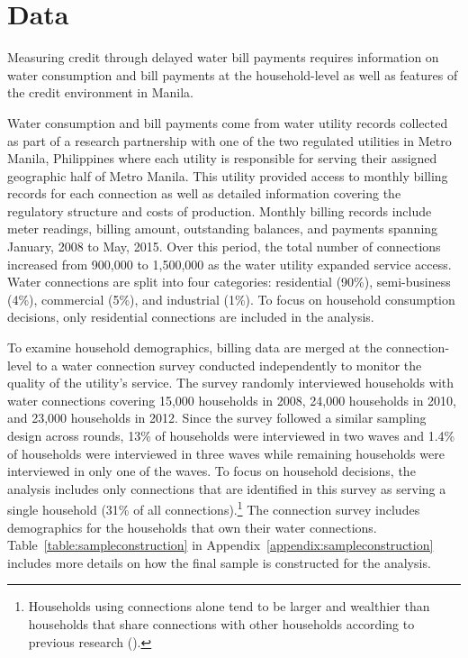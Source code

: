 \documentclass[12pt,table]{article}
\begin{document}



\section{Data}\label{section:data}



Measuring credit through delayed water bill payments requires information on water consumption and bill payments at the household-level as well as features of the credit environment in Manila.  %

Water consumption and bill payments come from water utility records collected as part of a research partnership with one of the two regulated utilities in Metro Manila, Philippines where each utility is responsible for serving their assigned geographic half of Metro Manila.  This utility provided access to monthly billing records for each connection as well as detailed information covering the regulatory structure and costs of production.  Monthly billing records include meter readings, billing amount, outstanding balances, and payments spanning January, 2008 to May, 2015. Over this period, the total number of connections increased from 900,000 to 1,500,000 as the water utility expanded service access.  Water connections are split into four categories: residential (90\%), semi-business (4\%), commercial (5\%), and industrial (1\%).  To focus on household consumption decisions, only residential connections are included in the analysis.

To examine household demographics, billing data are merged at the connection-level to a water connection survey conducted independently to monitor the quality of the utility's service.  The survey randomly interviewed households with water connections covering 15,000 households in 2008, 24,000 households in 2010, and 23,000 households in 2012.  Since the survey followed a similar sampling design across rounds, 13\% of households were interviewed in two waves and 1.4\% of households were interviewed in three waves while remaining households were interviewed in only one of the waves.  To focus on household decisions, the analysis includes only connections that are identified in this survey as serving a single household (31\% of all connections).\footnote{Households using connections alone tend to be larger and wealthier than households that share connections with other households according to previous research (\cite{wjv}).}  The connection survey includes demographics for the households that own their water connections.  Table~\ref{table:sampleconstruction} in Appendix~\ref{appendix:sampleconstruction} includes more details on how the final sample is constructed for the analysis.
\end{document}
